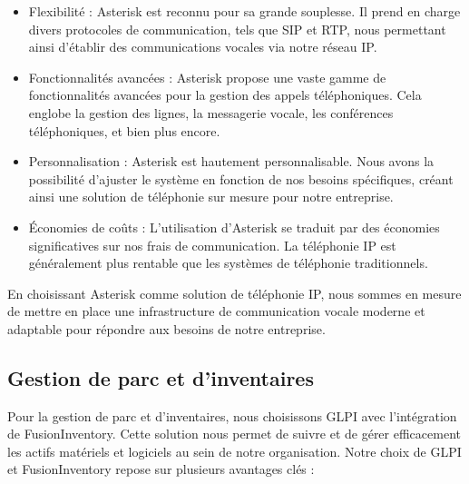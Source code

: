 \begin{itemize}


\item Flexibilité : Asterisk est reconnu pour sa grande souplesse. Il prend en charge divers protocoles de communication, tels que SIP et RTP, nous permettant ainsi d'établir des communications vocales via notre réseau IP.

\item Fonctionnalités avancées : Asterisk propose une vaste gamme de fonctionnalités avancées pour la gestion des appels téléphoniques. Cela englobe la gestion des lignes, la messagerie vocale, les conférences téléphoniques, et bien plus encore.

\item Personnalisation : Asterisk est hautement personnalisable. Nous avons la possibilité d'ajuster le système en fonction de nos besoins spécifiques, créant ainsi une solution de téléphonie sur mesure pour notre entreprise.

\item Économies de coûts : L'utilisation d'Asterisk se traduit par des économies significatives sur nos frais de communication. La téléphonie IP est généralement plus rentable que les systèmes de téléphonie traditionnels.


\end{itemize}

En choisissant Asterisk comme solution de téléphonie IP, nous sommes en mesure de mettre en place une infrastructure de communication vocale moderne et adaptable pour répondre aux besoins de notre entreprise.




\subsection{Gestion de parc et d'inventaires}

Pour la gestion de parc et d'inventaires, nous choisissons GLPI avec l'intégration de FusionInventory. Cette solution nous permet de suivre et de gérer efficacement les actifs matériels et logiciels au sein de notre organisation. Notre choix de GLPI et FusionInventory repose sur plusieurs avantages clés :

